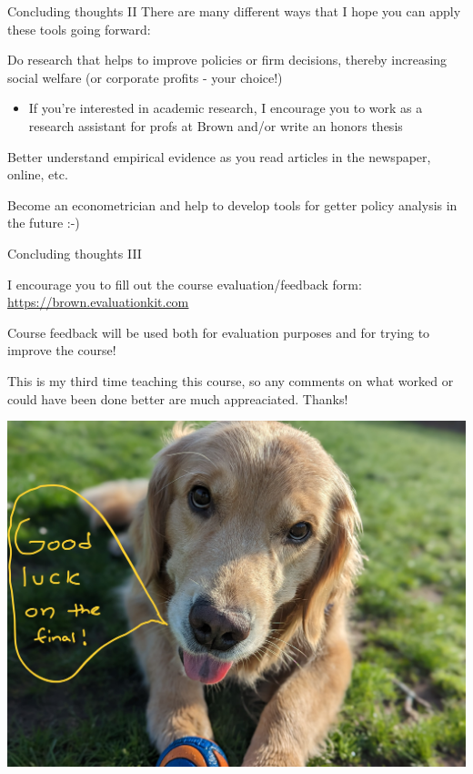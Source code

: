 \documentclass[11pt,english,handout]{beamer}
\newenvironment{wideitemize}{\itemize\addtolength{\itemsep}{10pt}}{\enditemize}
\begin{document}
\begin{frame}{Concluding thoughts II}
There are many different ways that I hope you can apply these tools going forward: \medskip

\begin{wideitemize}
	\item
	Do research that helps to improve policies or firm decisions, thereby increasing social welfare (or corporate profits - your choice!)
	
		\begin{itemize}
			\item 
			If you're interested in academic research, I encourage you to work as a research assistant for profs at Brown and/or write an honors thesis
		\end{itemize}
	
	\item
	Better understand empirical evidence as you read articles in the newspaper, online, etc.
	
	\item
	Become an econometrician and help to develop tools for getter policy analysis in the future :-) 
	
	
\end{wideitemize}

	
\end{frame}


\begin{frame}{Concluding thoughts III}
	\begin{wideitemize}
		\item
		I encourage you to fill out the course evaluation/feedback form: \href{https://brown.evaluationkit.com  }{\underline{https://brown.evaluationkit.com}}
		
		\item
		Course feedback will be used both for evaluation purposes and for trying to improve the course!
		
		\item
		This is my third time teaching this course, so any comments on what worked or could have been done better are much appreaciated. Thanks!
	\end{wideitemize}
\end{frame}

\begin{frame}
	\centering
	\includegraphics[width = 0.9 \linewidth]{poppy-good-luck}
\end{frame}
\end{document}
